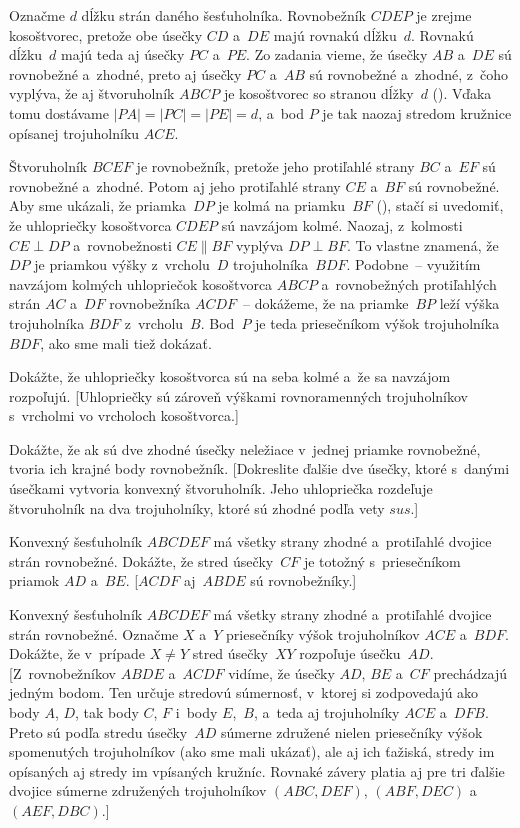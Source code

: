 {%
Označme $d$ dĺžku strán daného šesťuholníka.
Rovnobežník $CDEP$ je zrejme kosoštvorec, pretože obe úsečky
$CD$ a~$DE$ majú rovnakú dĺžku~$d$. Rovnakú dĺžku~$d$ majú teda
aj úsečky $PC$ a~$PE$. Zo zadania
vieme, že úsečky $AB$ a~$DE$ sú rovnobežné a~zhodné, preto aj úsečky
$PC$ a~$AB$ sú rovnobežné a~zhodné, z~čoho vyplýva, že aj štvoruholník
$ABCP$ je kosoštvorec so stranou dĺžky~$d$ (\obr). Vďaka tomu
dostávame $|PA| = |PC| = |PE| = d$, a~bod $P$ je tak naozaj stredom
kružnice opísanej trojuholníku $ACE$.
%

Štvoruholník $BCEF$ je rovnobežník, pretože jeho protiľahlé strany $BC$
a~$EF$ sú rovnobežné a~zhodné. Potom aj jeho protiľahlé strany $CE$
a~$BF$ sú rovnobežné. Aby sme ukázali, že priamka~$DP$ je
kolmá na priamku~$BF$ (\obr), stačí si uvedomiť, že
uhlopriečky kosoštvorca $CDEP$ sú
navzájom kolmé. Naozaj, z~kolmosti ${CE \perp DP}$
a~rovnobežnosti $CE \parallel BF$ vyplýva $DP \perp BF$. To vlastne
znamená, že $DP$ je priamkou výšky z~vrcholu~$D$ trojuholníka~$BDF$.
Podobne~-- využitím navzájom kolmých uhlopriečok kosoštvorca $ABCP$
a~rovnobežných protiľahlých strán $AC$ a~$DF$ rovnobežníka $ACDF$~--
dokážeme, že na priamke~$BP$ leží výška trojuholníka $BDF$ z~vrcholu~$B$. Bod~$P$
je teda priesečníkom výšok trojuholníka $BDF$, ako sme mali tiež dokázať.


Dokážte, že uhlopriečky kosoštvorca sú na seba kolmé a~že sa navzájom
rozpoľujú. [Uhlopriečky sú zároveň výškami rovnoramenných trojuholníkov
s~vrcholmi vo vrcholoch kosoštvorca.]

Dokážte, že ak sú dve zhodné úsečky neležiace v~jednej priamke rovnobežné,
tvoria ich krajné body rovnobežník. [Dokreslite ďalšie dve úsečky, ktoré
s~danými úsečkami vytvoria konvexný štvoruholník. Jeho
uhlopriečka rozdeľuje štvoruholník na dva trojuholníky, ktoré sú zhodné podľa
vety $sus$.]

\D
Konvexný šesťuholník $ABCDEF$ má všetky strany zhodné a~protiľahlé
dvojice strán rovnobežné. Dokážte, že stred úsečky~$CF$ je totožný s~priesečníkom
priamok $AD$ a~$BE$. [$ACDF$ aj~$ABDE$ sú rovnobežníky.]

Konvexný šesťuholník $ABCDEF$ má všetky strany zhodné a~protiľahlé
dvojice strán rovnobežné. Označme $X$ a~$Y$ priesečníky výšok trojuholníkov
$ACE$ a~$BDF$. Dokážte, že v~prípade $X\ne Y$ stred úsečky~$XY$ rozpoľuje úsečku~$AD$.
[Z~rovnobežníkov $ABDE$ a~$ACDF$ vidíme, že úsečky $AD$, $BE$ a~$CF$ prechádzajú
jedným bodom. Ten určuje stredovú súmernosť, v~ktorej si zodpovedajú ako body $A$, $D$,
tak body $C$, $F$ i~body $E$,~$B$, a~teda aj trojuholníky $ACE$ a~$DFB$. Preto sú
podľa stredu úsečky~$AD$ súmerne združené nielen priesečníky výšok spomenutých trojuholníkov
(ako sme mali ukázať), ale aj ich ťažiská, stredy im opísaných aj stredy im
vpísaných kružníc. Rovnaké závery platia aj pre tri ďalšie dvojice súmerne združených
trojuholníkov $(ABC,DEF)$, $(ABF,DEC)$ a~$(AEF,DBC)$.]
}

